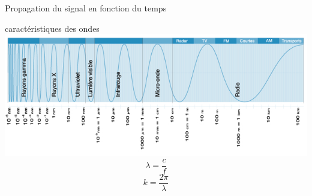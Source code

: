 \documentclass{beamer}
\begin{document}
\begin{frame}{Propagation du signal en fonction du temps}

\end{frame}
\begin{frame}{caractéristiques des ondes}
\includegraphics[scale=0.4]{a3400_electromagnatique_fr_g.jpg}
$$\lambda = \frac{c}{f}$$
$$ k=\frac{2 \pi}{\lambda}$$
\end{frame}
\end{document}
